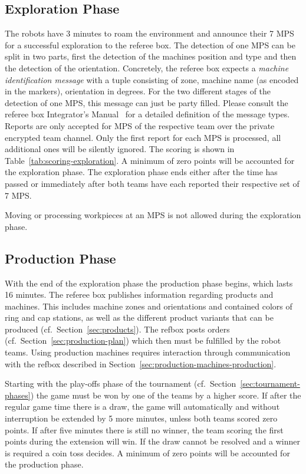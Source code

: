 \documentclass[12pt,twoside]{article}
\newcommand{\refsec}[1]{Section~\ref{#1}}
\newcommand{\reftab}[1]{Table~\ref{#1}}
\begin{document}
\subsection{Exploration Phase}
\label{sec:exploration-phase}
The
robots have 3 minutes to roam the environment and announce their 7 MPS
for a successful exploration to the referee box. The detection of one
MPS can be split in two parts, first the detection of the machines
position and type and then the detection of the orientation.
Concretely, the referee box expects a \emph{machine identification
  message} with a tuple consisting of zone, machine name (as encoded
in the markers), orientation in degrees. For the two
different stages of the detection of one MPS, this message can just be
party filled.  Please consult the referee box Integrator's
Manual~\cite{RefBoxIntManual} for a detailed definition of the message
types. Reports are only accepted for MPS of the respective team over
the private encrypted team channel. Only the first report for each MPS
is processed, all additional ones will be silently ignored. The
scoring is shown in \reftab{tab:scoring-exploration}. A minimum of
zero points will be accounted for the exploration phase. The
exploration phase ends either after the time has passed or immediately
after both teams have each reported their respective set of 7 MPS.

Moving or processing workpieces at an MPS is not allowed during the
exploration phase.

\subsection{Production Phase}
\label{sec:production-phase}
With the end of the exploration phase the production phase begins,
which lasts \num{16} minutes. The referee box publishes information
regarding products and machines. This includes machine zones and orientations and
contained colors of ring and cap stations, as well as the different
product variants that can be produced (cf.~\refsec{sec:products}). The
refbox posts orders (cf.~\refsec{sec:production-plan}) which then must
be fulfilled by the robot teams. Using production machines requires
interaction through communication with the refbox described in
\refsec{sec:production-machines-production}.

Starting with the play-offs phase of the tournament
(cf.~\refsec{sec:tournament-phases}) the game must be won by one of
the teams by a higher score. If after the regular game time there is a
draw, the game will automatically and without interruption be extended
by 5 more minutes, unless both teams scored zero points. If after five
minutes there is still no winner, the team scoring the first points
during the extension will win. If the draw cannot be resolved and a
winner is required a coin toss decides. A minimum of zero points will
be accounted for the production phase.
\end{document}
